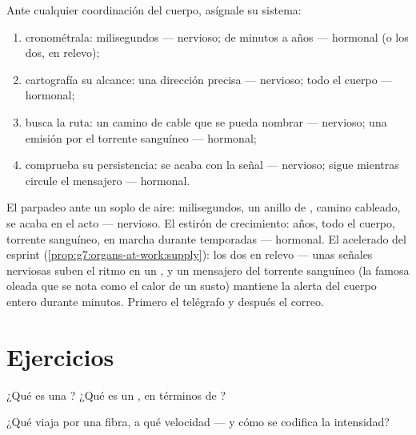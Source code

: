 \begin{method}\label{met:g8:nervous-communication:diagnose}
Ante cualquier coordinación del cuerpo, asígnale su sistema:
\begin{enumerate}
  \item cronométrala: milisegundos --- nervioso; de minutos a años ---
        hormonal (o los dos, en relevo);
  \item cartografía su alcance: una dirección precisa --- nervioso;
        todo el cuerpo --- hormonal;
  \item busca la ruta: un camino de cable que se pueda nombrar ---
        nervioso; una emisión por el torrente sanguíneo --- hormonal;
  \item comprueba su persistencia: se acaba con la señal --- nervioso;
        sigue mientras circule el mensajero --- hormonal.
\end{enumerate}
\end{method}

\begin{example}\label{ex:g8:nervous-communication:cases}
El parpadeo ante un soplo de aire: milisegundos, un anillo de ,
camino cableado, se acaba en el acto --- nervioso. El estirón de
crecimiento: años, todo el cuerpo, torrente sanguíneo, en marcha
durante temporadas --- hormonal. El  acelerado del esprint
(\cref{prop:g7:organs-at-work:supply}): los dos en relevo --- unas
señales nerviosas suben el ritmo en un , y un mensajero del
torrente sanguíneo (la famosa oleada que se nota como el calor de un
susto) mantiene la alerta del cuerpo entero durante minutos. Primero el
telégrafo y después el correo.
\end{example}

\section{Ejercicios}

\begin{exercise}[$\star$]\label{exo:g8:nervous-communication:1}
¿Qué es una ? ¿Qué es un , en términos de ?
\end{exercise}

\begin{exercise}[$\star$]\label{exo:g8:nervous-communication:2}
¿Qué viaja por una fibra, a qué velocidad --- y cómo se codifica la
intensidad?
\end{exercise}

